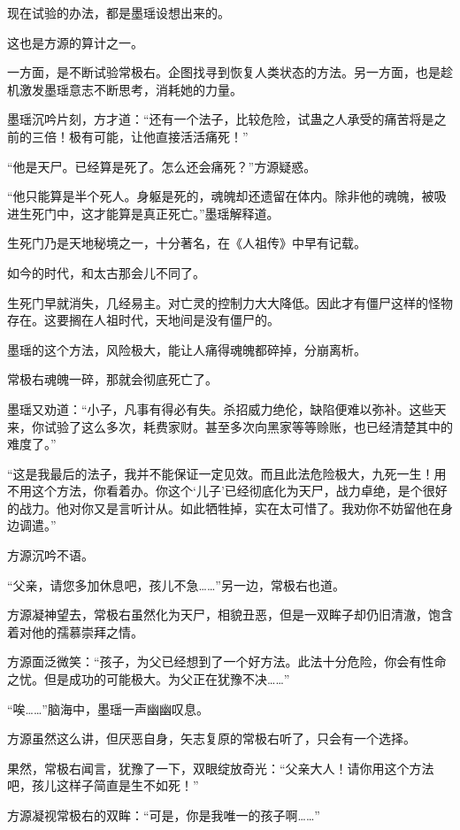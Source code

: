 \begin{this_body}
现在试验的办法，都是墨瑶设想出来的。

这也是方源的算计之一。

一方面，是不断试验常极右。企图找寻到恢复人类状态的方法。另一方面，也是趁机激发墨瑶意志不断思考，消耗她的力量。

墨瑶沉吟片刻，方才道：“还有一个法子，比较危险，试蛊之人承受的痛苦将是之前的三倍！极有可能，让他直接活活痛死！”

“他是天尸。已经算是死了。怎么还会痛死？”方源疑惑。

“他只能算是半个死人。身躯是死的，魂魄却还遗留在体内。除非他的魂魄，被吸进生死门中，这才能算是真正死亡。”墨瑶解释道。

生死门乃是天地秘境之一，十分著名，在《人祖传》中早有记载。

如今的时代，和太古那会儿不同了。

生死门早就消失，几经易主。对亡灵的控制力大大降低。因此才有僵尸这样的怪物存在。这要搁在人祖时代，天地间是没有僵尸的。

墨瑶的这个方法，风险极大，能让人痛得魂魄都碎掉，分崩离析。

常极右魂魄一碎，那就会彻底死亡了。

墨瑶又劝道：“小子，凡事有得必有失。杀招威力绝伦，缺陷便难以弥补。这些天来，你试验了这么多次，耗费家财。甚至多次向黑家等等赊账，也已经清楚其中的难度了。”

“这是我最后的法子，我并不能保证一定见效。而且此法危险极大，九死一生！用不用这个方法，你看着办。你这个‘儿子’已经彻底化为天尸，战力卓绝，是个很好的战力。他对你又是言听计从。如此牺牲掉，实在太可惜了。我劝你不妨留他在身边调遣。”

方源沉吟不语。

“父亲，请您多加休息吧，孩儿不急……”另一边，常极右也道。

方源凝神望去，常极右虽然化为天尸，相貌丑恶，但是一双眸子却仍旧清澈，饱含着对他的孺慕崇拜之情。

方源面泛微笑：“孩子，为父已经想到了一个好方法。此法十分危险，你会有性命之忧。但是成功的可能极大。为父正在犹豫不决……”

“唉……”脑海中，墨瑶一声幽幽叹息。

方源虽然这么讲，但厌恶自身，矢志复原的常极右听了，只会有一个选择。

果然，常极右闻言，犹豫了一下，双眼绽放奇光：“父亲大人！请你用这个方法吧，孩儿这样子简直是生不如死！”

方源凝视常极右的双眸：“可是，你是我唯一的孩子啊……”


\end{this_body}
